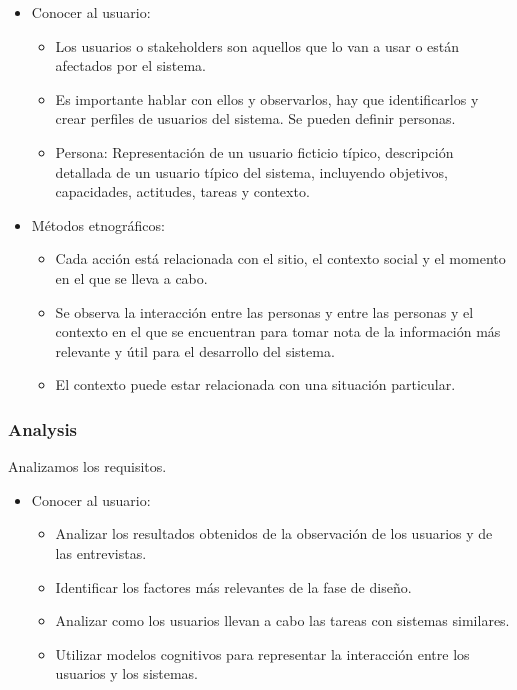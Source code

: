 \documentclass[12pt, twoside, openright]{report} %
\begin{document}
    \begin{itemize}
    
    \item
      Conocer al usuario:

      \begin{itemize}
      
      \item
        Los usuarios o stakeholders son aquellos que lo van a usar o
        están afectados por el sistema.
      \item
        Es importante hablar con ellos y observarlos, hay que
        identificarlos y crear perfiles de usuarios del sistema. Se
        pueden definir personas.
      \item
        Persona: Representación de un usuario ficticio típico,
        descripción detallada de un usuario típico del sistema,
        incluyendo objetivos, capacidades, actitudes, tareas y contexto.
      \end{itemize}
    \item
      Métodos etnográficos:

      \begin{itemize}
      
      \item
        Cada acción está relacionada con el sitio, el contexto social y
        el momento en el que se lleva a cabo.
      \item
        Se observa la interacción entre las personas y entre las
        personas y el contexto en el que se encuentran para tomar nota
        de la información más relevante y útil para el desarrollo del
        sistema.
      \item
        El contexto puede estar relacionada con una situación particular.
      \end{itemize}
    \end{itemize}
\subsubsection{Analysis}
	Analizamos los requisitos.

    \begin{itemize}
    
    \item
      Conocer al usuario:

      \begin{itemize}
      
      \item
        Analizar los resultados obtenidos de la observación de los
        usuarios y de las entrevistas.
      \item
        Identificar los factores más relevantes de la fase de diseño.
      \item
        Analizar como los usuarios llevan a cabo las tareas con sistemas
        similares.
      \item
        Utilizar modelos cognitivos para representar la interacción
        entre los usuarios y los sistemas.
      \end{itemize}
    \end{itemize}
\end{document}
